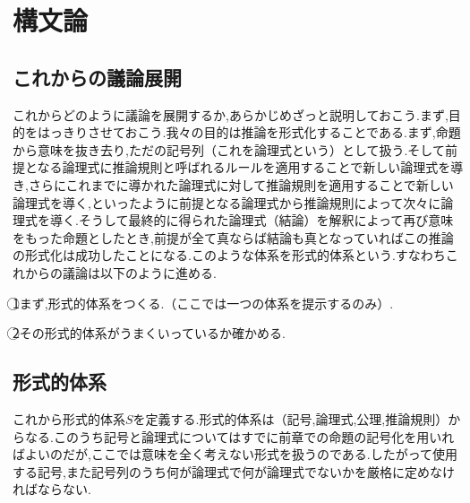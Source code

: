\documentclass[10pt,b5paper,papersize,dvipdfmx]{jsbook}
\begin{document}
\section{構文論}
\subsection{これからの議論展開}
これからどのように議論を展開するか,あらかじめざっと説明しておこう.まず,目的をはっきりさせておこう.我々の目的は推論を形式化することである.まず,命題から意味を抜き去り,ただの記号列（これを論理式という）として扱う.そして前提となる論理式に推論規則と呼ばれるルールを適用することで新しい論理式を導き,さらにこれまでに導かれた論理式に対して推論規則を適用することで新しい論理式を導く,といったように前提となる論理式から推論規則によって次々に論理式を導く.そうして最終的に得られた論理式（結論）を解釈によって再び意味をもった命題としたとき,前提が全て真ならば結論も真となっていればこの推論の形式化は成功したことになる.このような体系を形式的体系という.すなわちこれからの議論は以下のように進める. \par
\par
\textcircled{\scriptsize 1}まず,形式的体系をつくる.（ここでは一つの体系を提示するのみ）. \par
\textcircled{\scriptsize 2}その形式的体系がうまくいっているか確かめる. \par
\par

\subsection{形式的体系}
これから形式的体系$S$を定義する.形式的体系は（記号,論理式,公理,推論規則）からなる.このうち記号と論理式についてはすでに前章での命題の記号化を用いればよいのだが,ここでは意味を全く考えない形式を扱うのである.したがって使用する記号,また記号列のうち何が論理式で何が論理式でないかを厳格に定めなければならない. 
\end{document}
